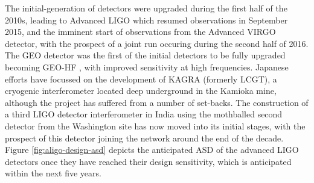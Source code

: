 The initial-generation of detectors were upgraded during the first
half of the 2010s, leading to Advanced LIGO\cite{2015CQGra..32g4001L}
which resumed observations in September 2015, and the imminent start
of observations from the Advanced VIRGO
detector\cite{2015CQGra..32b4001A}, with the prospect of a joint run
occuring during the second half of 2016. The GEO detector was the
first of the initial detectors to be fully upgraded becoming GEO-HF
\cite{2006CQGra..23S.207W}, with improved sensitivity at high
frequencies. Japanese efforts have focussed on the development of
KAGRA (formerly LCGT), a cryogenic interferometer located deep
underground in the Kamioka mine\cite{1999IJMPD...8..557K}, although
the project has suffered from a number of set-backs. The construction
of a third LIGO detector interferometer in India using the mothballed
second detector from the Washington site has now moved into its
initial stages, with the prospect of this detector joining the network
around the end of the decade. Figure \ref{fig:aligo-design-asd}
depicts the anticipated ASD of the advanced LIGO detectors once they
have reached their design sensitivity, which is anticipated within the
next five years.


